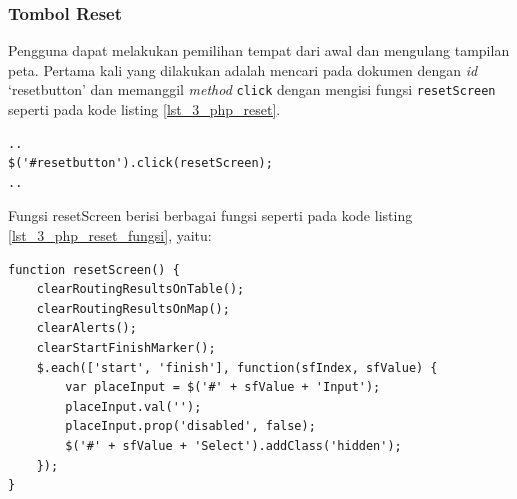 \subsubsection{Tombol Reset}
Pengguna dapat melakukan pemilihan tempat dari awal dan mengulang tampilan peta. Pertama kali yang dilakukan adalah mencari pada dokumen dengan \textit{id} `resetbutton' dan memanggil \textit{method} \verb!click! dengan mengisi fungsi \verb!resetScreen! seperti pada kode listing \ref{lst_3_php_reset}. 

\begin{lstlisting}[caption=\textit{Method} untuk memanggil fungsi JavaScript ketika tombol \textit{reset} ditekan ,label = {lst_3_php_reset}]
..
$('#resetbutton').click(resetScreen);
..
\end{lstlisting}

Fungsi resetScreen berisi berbagai fungsi seperti pada kode listing \ref{lst_3_php_reset_fungsi}, yaitu:

\begin{lstlisting}[caption=Fungsi JavaScript resetScreen ,label = {lst_3_php_reset_fungsi}]	
function resetScreen() {
	clearRoutingResultsOnTable();
	clearRoutingResultsOnMap();
	clearAlerts();
	clearStartFinishMarker();
	$.each(['start', 'finish'], function(sfIndex, sfValue) {
		var placeInput = $('#' + sfValue + 'Input');
		placeInput.val('');	
		placeInput.prop('disabled', false);
		$('#' + sfValue + 'Select').addClass('hidden');
	});
}
\end{lstlisting}

